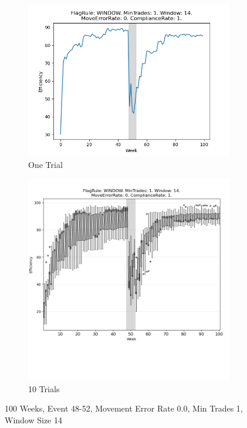 \documentclass{article}%
\begin{document}
\begin{figure}[!htb]%
\begin{subfigure}[b]{0.45\linewidth}%
\includegraphics[width=\linewidth]{0050fr_WINDOW_mt_1_ws_14_er_0_cr_1_t1.png}%
\caption{One Trial}%
\end{subfigure}%
\begin{subfigure}[b]{0.45\linewidth}%
\includegraphics[clip,width=\linewidth,trim=0 4cm 0 0]{0050fr_WINDOW_mt_1_ws_14_er_0_cr_1_t10.png}%
\caption{10 Trials}%
\end{subfigure}%
\caption{100 Weeks, Event 48{-}52, Movement Error Rate 0.0, Min Trades 1, Window Size 14}%
\end{figure}
\end{document}

